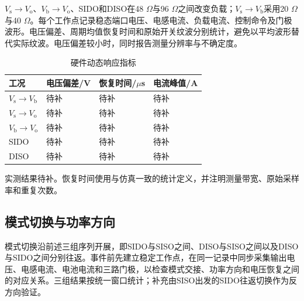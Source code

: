 \documentclass[UTF8,fontset=fandol,a4paper,twocolumn,10pt]{ctexart}
\begin{document}
$V_{\mathrm s}$$\to$$V_{\mathrm o}$、$V_{\mathrm b}$$\to$$V_{\mathrm o}$、SIDO和DISO在48 $\Omega$与96 $\Omega$之间改变负载；$V_{\mathrm s}$$\to$$V_{\mathrm b}$采用20 $\Omega$与40 $\Omega$。每个工作点记录稳态端口电压、电感电流、负载电流、控制命令及门极波形。电压偏差、周期均值恢复时间和原始开关纹波分别统计，避免以平均波形替代实际纹波。电压偏差较小时，同时报告测量分辨率与不确定度。

\begin{center}
\label{fig:14}\end{center}

\begin{table}[!tp]\centering\caption{硬件动态响应指标}\label{tab:9}\small\setlength{\tabcolsep}{3pt}
\begin{tabularx}{\textwidth}{YYYY}\toprule
\textbf{工况} & \textbf{电压偏差/V} & \textbf{恢复时间/$\mu$s} & \textbf{电流峰值/A}\\\midrule
$V_{\mathrm s}$$\to$$V_{\mathrm b}$ & 待补 & 待补 & 待补\\
$V_{\mathrm s}$$\to$$V_{\mathrm o}$ & 待补 & 待补 & 待补\\
$V_{\mathrm b}$$\to$$V_{\mathrm o}$ & 待补 & 待补 & 待补\\
SIDO & 待补 & 待补 & 待补\\
DISO & 待补 & 待补 & 待补\\
\bottomrule\end{tabularx}
\par\vspace{3pt}\begin{minipage}{\textwidth}\footnotesize 实测结果待补。恢复时间使用与仿真一致的统计定义，并注明测量带宽、原始采样率和重复次数。\end{minipage}
\end{table}


\subsection{模式切换与功率方向}

模式切换沿前述三组序列开展，即SIDO与SISO之间、DISO与SISO之间以及DISO与SIDO之间分别往返。事件前先建立稳定工作点，在同一记录中同步采集输出电压、电感电流、电池电流和三路门极，以检查模式交接、功率方向和电压恢复之间的对应关系。三组结果按统一窗口统计；补充由SISO出发的SIDO往返切换作为反方向验证。
\end{document}

